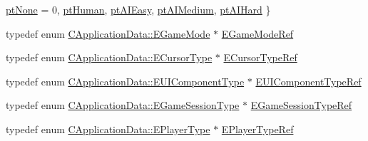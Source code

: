 \begin{DoxyCompactItemize}
\hyperlink{classCApplicationData_ae04b6b340297311972ce1e955196fcaaa091de1adaa447ed15f9f6bb25f0880f7}{pt\+None} = 0, 
\hyperlink{classCApplicationData_ae04b6b340297311972ce1e955196fcaaaf06f9bc64db8860bc03ecc330b11f234}{pt\+Human}, 
\hyperlink{classCApplicationData_ae04b6b340297311972ce1e955196fcaaa94da5a073589347212dc8f08c02a17a5}{pt\+A\+I\+Easy}, 
\hyperlink{classCApplicationData_ae04b6b340297311972ce1e955196fcaaa212e16bbc4488c26c54f3b37ac3a336e}{pt\+A\+I\+Medium}, 
\newline
\hyperlink{classCApplicationData_ae04b6b340297311972ce1e955196fcaaa421a2ddbb6243ca4d7e886bcbf490af5}{pt\+A\+I\+Hard}
 \}
\item 
typedef enum \hyperlink{classCApplicationData_ac8ac37a4c8bb871036fbbdc6a072e403}{C\+Application\+Data\+::\+E\+Game\+Mode} $\ast$ \hyperlink{classCApplicationData_ab56fe2209f0f43e42eef3fb09cf64029}{E\+Game\+Mode\+Ref}
\item 
typedef enum \hyperlink{classCApplicationData_ad024b66b60017c45c47a85dbc636ae69}{C\+Application\+Data\+::\+E\+Cursor\+Type} $\ast$ \hyperlink{classCApplicationData_acaef079bdad1f957a327d36fa6ee8c81}{E\+Cursor\+Type\+Ref}
\item 
typedef enum \hyperlink{classCApplicationData_ad49585591fc53bff1c89bc512170280d}{C\+Application\+Data\+::\+E\+U\+I\+Component\+Type} $\ast$ \hyperlink{classCApplicationData_a117c7e1886e2db3be85388b120ad1d34}{E\+U\+I\+Component\+Type\+Ref}
\item 
typedef enum \hyperlink{classCApplicationData_a0ec00515bf6b4b469b43ad62d615e3fa}{C\+Application\+Data\+::\+E\+Game\+Session\+Type} $\ast$ \hyperlink{classCApplicationData_acfb51c61ccc20a0cd5daa02973ab0870}{E\+Game\+Session\+Type\+Ref}
\item 
typedef enum \hyperlink{classCApplicationData_ae04b6b340297311972ce1e955196fcaa}{C\+Application\+Data\+::\+E\+Player\+Type} $\ast$ \hyperlink{classCApplicationData_a26f033ac5752403a511af304618f90fd}{E\+Player\+Type\+Ref}
\end{DoxyCompactItemize}
